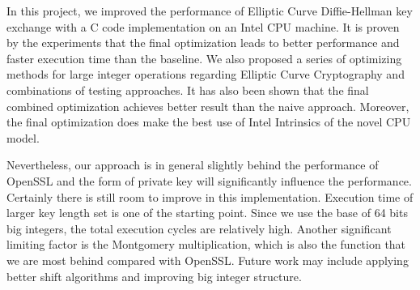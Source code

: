 In this project, we improved the performance of Elliptic Curve Diffie-Hellman key exchange with a C code implementation on an Intel CPU machine. It is proven by the experiments that the final optimization leads to better performance and faster execution time than the baseline. We also proposed a series of optimizing methods for large integer operations regarding Elliptic Curve Cryptography and combinations of testing approaches. It has also been shown that the final combined optimization achieves better result than the naive approach. Moreover, the final optimization does make the best use of Intel Intrinsics of the novel CPU model. 

Nevertheless, our approach is in general slightly behind the performance of OpenSSL and the form of private key will significantly influence the performance. Certainly there is still room to improve in this implementation. Execution time of larger key length set is one of the starting point. Since we use the base of 64 bits big integers, the total execution cycles are relatively high. Another significant limiting factor is the Montgomery multiplication, which is also the function that we are most behind compared with OpenSSL. Future work may include applying better shift algorithms and improving big integer structure.